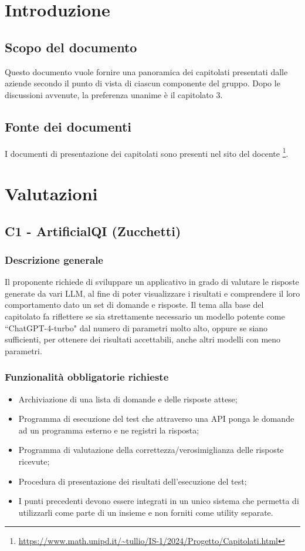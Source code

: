\documentclass[10pt]{article}
\begin{document}
\newpage
\tableofcontents{\newpage}

\section{Introduzione}
\subsection{Scopo del documento}
Questo documento vuole fornire una panoramica dei capitolati presentati dalle aziende secondo il punto di vista di ciascun componente del gruppo. Dopo le discussioni avvenute, la preferenza unanime è il capitolato 3.
\subsection{Fonte dei documenti}
I documenti di presentazione dei capitolati sono presenti nel sito del docente \footnote{\url{https://www.math.unipd.it/~tullio/IS-1/2024/Progetto/Capitolati.html}}.

\subsectionfont{\color{orange}}  %

\section{Valutazioni}
\subsection{C1 - ArtificialQI (Zucchetti)}
\subsubsection{Descrizione generale}
Il proponente richiede di sviluppare un applicativo in grado di valutare le risposte generate da vari LLM, al fine di poter visualizzare i risultati e comprendere il loro comportamento dato un set di domande e risposte. Il tema alla base del capitolato fa riflettere se sia strettamente necessario un modello potente come ``ChatGPT-4-turbo" dal numero di parametri molto alto, oppure se siano sufficienti, per ottenere dei risultati accettabili, anche altri modelli con meno parametri.
\subsubsection{Funzionalità obbligatorie richieste}
\begin{itemize}
    \item Archiviazione di una lista di domande e delle risposte attese;
    \item Programma di esecuzione del test che attraverso una API ponga le domande ad un programma esterno e ne registri la risposta;
    \item Programma di valutazione della correttezza/verosimiglianza delle risposte ricevute;
    \item Procedura di presentazione dei risultati dell’esecuzione del test;
    \item I punti precedenti devono essere integrati in un unico sistema che permetta di utilizzarli come parte di un insieme e non forniti come utility separate.
\end{itemize}
\end{document}
